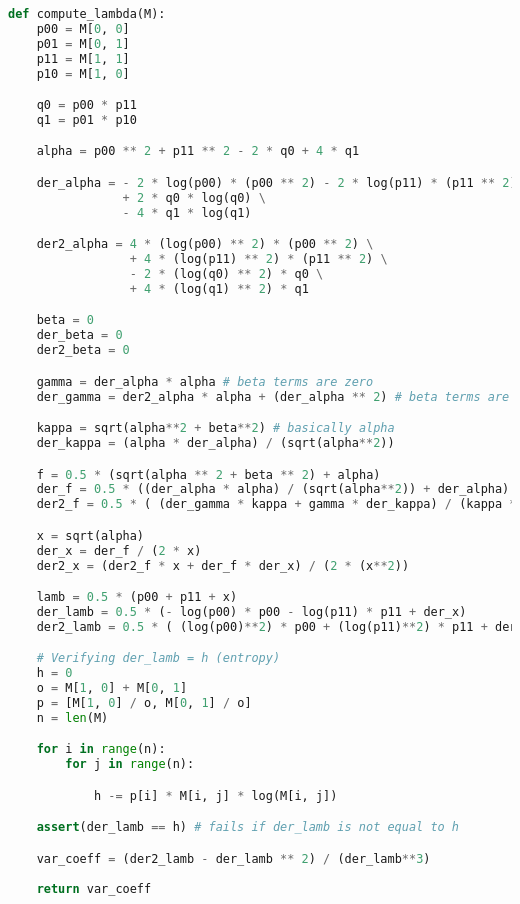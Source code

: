 \vspace{1em}
{\centering
\begin{lstlisting}[language=Python]
def compute_lambda(M):
    p00 = M[0, 0]
    p01 = M[0, 1]
    p11 = M[1, 1]
    p10 = M[1, 0]

    q0 = p00 * p11
    q1 = p01 * p10

    alpha = p00 ** 2 + p11 ** 2 - 2 * q0 + 4 * q1

    der_alpha = - 2 * log(p00) * (p00 ** 2) - 2 * log(p11) * (p11 ** 2) \
                + 2 * q0 * log(q0) \
                - 4 * q1 * log(q1)

    der2_alpha = 4 * (log(p00) ** 2) * (p00 ** 2) \
                 + 4 * (log(p11) ** 2) * (p11 ** 2) \
                 - 2 * (log(q0) ** 2) * q0 \
                 + 4 * (log(q1) ** 2) * q1

    beta = 0
    der_beta = 0
    der2_beta = 0

    gamma = der_alpha * alpha # beta terms are zero
    der_gamma = der2_alpha * alpha + (der_alpha ** 2) # beta terms are zero

    kappa = sqrt(alpha**2 + beta**2) # basically alpha
    der_kappa = (alpha * der_alpha) / (sqrt(alpha**2))

    f = 0.5 * (sqrt(alpha ** 2 + beta ** 2) + alpha)
    der_f = 0.5 * ((der_alpha * alpha) / (sqrt(alpha**2)) + der_alpha)
    der2_f = 0.5 * ( (der_gamma * kappa + gamma * der_kappa) / (kappa ** 2) + der2_alpha )

    x = sqrt(alpha)
    der_x = der_f / (2 * x)
    der2_x = (der2_f * x + der_f * der_x) / (2 * (x**2))

    lamb = 0.5 * (p00 + p11 + x)
    der_lamb = 0.5 * (- log(p00) * p00 - log(p11) * p11 + der_x)
    der2_lamb = 0.5 * ( (log(p00)**2) * p00 + (log(p11)**2) * p11 + der2_x )

    # Verifying der_lamb = h (entropy)
    h = 0
    o = M[1, 0] + M[0, 1]
    p = [M[1, 0] / o, M[0, 1] / o]
    n = len(M)

    for i in range(n):
        for j in range(n):

            h -= p[i] * M[i, j] * log(M[i, j])

    assert(der_lamb == h) # fails if der_lamb is not equal to h

    var_coeff = (der2_lamb - der_lamb ** 2) / (der_lamb**3)
    
    return var_coeff
\end{lstlisting}
}
 

